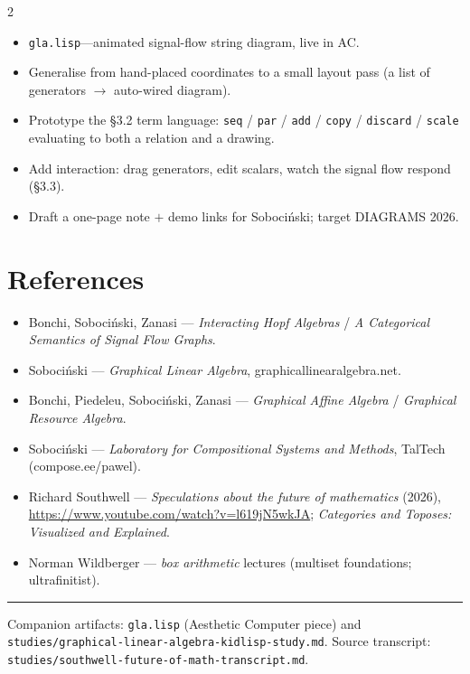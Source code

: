 \documentclass[11pt, letterpaper]{article}
\begin{document}
\begin{multicols}{2}
\begin{itemize}
  \item[$\checkmark$] \texttt{gla.lisp}---animated signal-flow string
    diagram, live in AC.
  \item[$\circ$] Generalise from hand-placed coordinates to a small
    layout pass (a list of generators $\to$ auto-wired diagram).
  \item[$\circ$] Prototype the \S3.2 term language: \texttt{seq} /
    \texttt{par} / \texttt{add} / \texttt{copy} / \texttt{discard} /
    \texttt{scale} evaluating to both a relation and a drawing.
  \item[$\circ$] Add interaction: drag generators, edit scalars, watch
    the signal flow respond (\S3.3).
  \item[$\circ$] Draft a one-page note $+$ demo links for Soboci\'nski;
    target DIAGRAMS 2026.
\end{itemize}

\section*{References}

\begin{itemize}
  \item Bonchi, Soboci\'nski, Zanasi --- \emph{Interacting Hopf Algebras}
    / \emph{A Categorical Semantics of Signal Flow Graphs}.
  \item Soboci\'nski --- \emph{Graphical Linear Algebra},
    graphicallinearalgebra.net.
  \item Bonchi, Piedeleu, Soboci\'nski, Zanasi --- \emph{Graphical Affine
    Algebra} / \emph{Graphical Resource Algebra}.
  \item Soboci\'nski --- \emph{Laboratory for Compositional Systems and
    Methods}, TalTech (compose.ee/pawel).
  \item Richard Southwell --- \emph{Speculations about the future of
    mathematics} (2026), \url{https://www.youtube.com/watch?v=l619jN5wkJA};
    \emph{Categories and Toposes: Visualized and Explained}.
  \item Norman Wildberger --- \emph{box arithmetic} lectures (multiset
    foundations; ultrafinitist).
\end{itemize}

\end{multicols}

\vspace{1em}
\noindent\rule{\textwidth}{0.5pt}\par
\vspace{0.3em}
{\footnotesize\color{acgray} Companion artifacts: \texttt{gla.lisp}
(Aesthetic Computer piece) and
\texttt{studies/graphical-linear-algebra-kidlisp-study.md}. Source
transcript: \texttt{studies/southwell-future-of-math-transcript.md}.}
\end{document}
